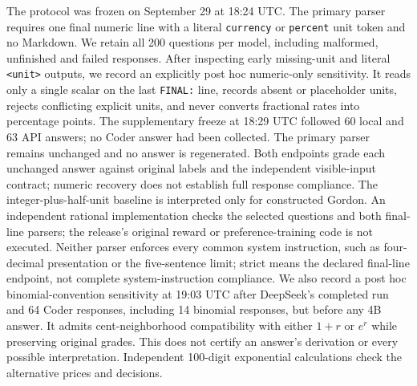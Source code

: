 The protocol was frozen on September 29 at 18:24 UTC. The primary parser requires one final numeric line with a literal \texttt{currency} or \texttt{percent} unit token and no Markdown. We retain all 200 questions per model, including malformed,
unfinished and failed responses. After inspecting early missing-unit and literal \texttt{<unit>} outputs, we record an explicitly post hoc numeric-only sensitivity. It reads only a single scalar on the last
\texttt{FINAL:} line, records absent or placeholder units, rejects conflicting explicit units, and never converts fractional rates into percentage points. The supplementary freeze at 18:29 UTC followed 60 local
and 63 API answers; no Coder answer had been collected. The primary parser remains unchanged and no answer is regenerated. Both endpoints grade each unchanged answer against original labels and the independent
visible-input contract; numeric recovery does not establish full response compliance. The integer-plus-half-unit baseline is interpreted only for constructed Gordon. An independent rational implementation
checks the selected questions and both final-line parsers; the release's original reward or preference-training code is not executed. Neither parser enforces every common system instruction, such as
four-decimal presentation or the five-sentence limit; strict means the declared final-line endpoint, not complete system-instruction compliance. We also record a post hoc binomial-convention sensitivity at
19:03 UTC after DeepSeek's completed run and 64 Coder responses, including 14 binomial responses, but before any 4B answer. It admits cent-neighborhood compatibility with either $1+r$ or $e^r$ while preserving
original grades. This does not certify an answer's derivation or every possible interpretation. Independent 100-digit exponential calculations check the alternative prices and decisions.


